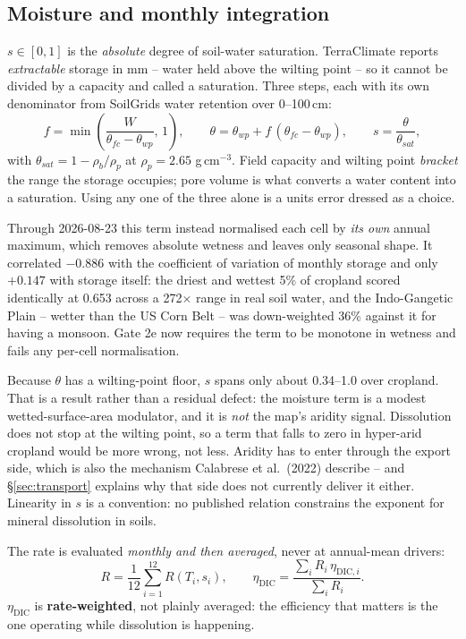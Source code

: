 \documentclass[11pt,a4paper]{article}
\begin{document}
\subsection{Moisture and monthly integration}\label{sec:moisture}

$s \in [0,1]$ is the \emph{absolute} degree of soil-water saturation. TerraClimate
reports \emph{extractable} storage in mm -- water held above the wilting point --
so it cannot be divided by a capacity and called a saturation. Three steps, each
with its own denominator from SoilGrids water retention over 0--100\,cm:
\begin{equation}
f = \min\!\left(\frac{W}{\theta_{fc} - \theta_{wp}},\, 1\right),
\qquad
\theta = \theta_{wp} + f\,(\theta_{fc} - \theta_{wp}),
\qquad
s = \frac{\theta}{\theta_{sat}},
\end{equation}
with $\theta_{sat} = 1 - \rho_b/\rho_p$ at $\rho_p = 2.65$
g\,cm$^{-3}$. Field capacity and wilting point \emph{bracket} the range the
storage occupies; pore volume is what converts a water content into a saturation.
Using any one of the three alone is a units error dressed as a choice.

Through 2026-08-23 this term instead normalised each cell by \emph{its own} annual
maximum, which removes absolute wetness and leaves only seasonal shape. It
correlated $-0.886$ with the coefficient of variation of monthly storage and only
$+0.147$ with storage itself: the driest and wettest 5\% of cropland scored
identically at 0.653 across a 272$\times$ range in real soil water, and the
Indo-Gangetic Plain -- wetter than the US Corn Belt -- was down-weighted 36\%
against it for having a monsoon. Gate 2e now requires the term to be monotone in
wetness and fails any per-cell normalisation.

Because $\theta$ has a wilting-point floor, $s$ spans only about 0.34--1.0 over
cropland. That is a result rather than a residual defect: the moisture term is a
modest wetted-surface-area modulator, and it is \emph{not} the map's aridity
signal. Dissolution does not stop at the wilting point, so a term that falls to
zero in hyper-arid cropland would be more wrong, not less. Aridity has to enter
through the export side, which is also the mechanism Calabrese et al.\ (2022)
describe -- and \S\ref{sec:transport} explains why that side does not currently
deliver it either. Linearity in $s$ is a convention: no published relation
constrains the exponent for mineral dissolution in soils.

The rate is evaluated \emph{monthly and then averaged}, never at annual-mean
drivers:
\begin{equation}
R = \frac{1}{12}\sum_{i=1}^{12} R(T_i, s_i),
\qquad
\eta_{\mathrm{DIC}} = \frac{\sum_i R_i\, \eta_{\mathrm{DIC},i}}{\sum_i R_i} .
\end{equation}
$\eta_{\mathrm{DIC}}$ is \textbf{rate-weighted}, not plainly averaged: the
efficiency that matters is the one operating while dissolution is happening.
\end{document}
